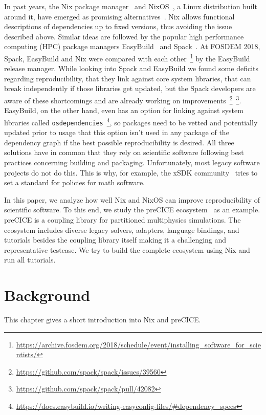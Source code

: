 \documentclass{eceasst}
\begin{document}
In past years, the Nix package manager~\cite{Dolstra_2004} and NixOS~\cite{Dolstra_2010}, a Linux distribution built around it, have emerged as promising alternatives~\cite{Devresse_2015}.
Nix allows functional descriptions of dependencies up to fixed versions, thus avoiding the issue described above.
Similar ideas are followed by the popular high performance computing (HPC) package managers EasyBuild~\cite{easybuil6495863} and Spack~\cite{spack7832814}.
At FOSDEM 2018, Spack, EasyBuild and Nix were compared with each other~\footnote{\url{https://archive.fosdem.org/2018/schedule/event/installing\_software\_for\_scientists/}} by the EasyBuild release manager.
While looking into Spack and EasyBuild we found some deficits regarding reproducibility, that they link against core system libraries, that can break independently if those libraries get updated, but the Spack developers are aware of these shortcomings and are already working on improvements~\footnote{\url{https://github.com/spack/spack/issues/39560}}~\footnote{\url{https://github.com/spack/spack/pull/42082}}.
EasyBuild, on the other hand, even has an option for linking against system libraries called \texttt{osdependencies}~\footnote{\url{https://docs.easybuild.io/writing-easyconfig-files/\#dependency\_specs}}, so packages need to be vetted and potentially updated prior to usage that this option isn't used in any package of the dependency graph if the best possible reproducibility is desired.
All three solutions have in common that they rely on scientific software following best practices concerning building and packaging.
Unfortunately, most legacy software projects do not do this.
This is why, for example, the xSDK community~\cite{xSDK2023} tries to set a standard for policies for math software.

In this paper, we analyze how well Nix and NixOS can improve reproducibility of scientific software.
To this end, we study the preCICE ecosystem~\cite{preCICEv2} as an example.
preCICE is a coupling library for partitioned multiphysics simulations.
The ecosystem includes diverse legacy solvers, adapters, language bindings, and tutorials besides the coupling library itself making it a challenging and representative testcase.
We try to build the complete ecosystem using Nix and run all tutorials.

\section{Background}

This chapter gives a short introduction into Nix and preCICE.
\end{document}
